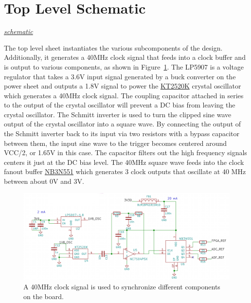 \section{Top Level Schematic}

\textit{\hyperlink{schematic.1}{schematic}}

The top level sheet instantiates the various subcomponents of the design. Additionally, it generates
a 40MHz clock signal that feeds into a clock buffer and is output to various components, as shown in
Figure~\ref{fig:clock-generator}. The LP5907 is a voltage regulator that takes a 3.6V input signal
generated by a buck converter on the power sheet and outputs a 1.8V signal to power the
\href{https://media.digikey.com/pdf/Data\%20Sheets/AVX\%20PDFs/KT2520K40000DAW18TAS_Spec.pdf}{KT2520K}
crystal oscillator which generates a 40MHz clock signal. The coupling capacitor attached in series to
the output of the crystal oscillator will prevent a DC bias from leaving the crystal oscillator. The
Schmitt inverter is used to turn the clipped sine wave output of the crystal oscillator into a
square wave. By connecting the output of the Schmitt inverter back to its input via two resistors
with a bypass capacitor between them, the input sine wave to the trigger becomes centered around
VCC/2, or 1.65V in this case. The capacitor filters out the high frequency signals centers it just at
the DC bias level. The 40MHz square wave feeds into the clock fanout buffer
\href{http://www.onsemi.com/pub/Collateral/NB3N551-D.PDF}{NB3N551} which generates 3 clock outputs
that oscillate at 40 MHz between about 0V and 3V.

\begin{figure}[h]
  \centering
  \includegraphics[width=1.0\textwidth]{data/clock-generator.png}
  \caption{A 40MHz clock signal is used to synchronize different components on the board.}
  \label{fig:clock-generator}
\end{figure}